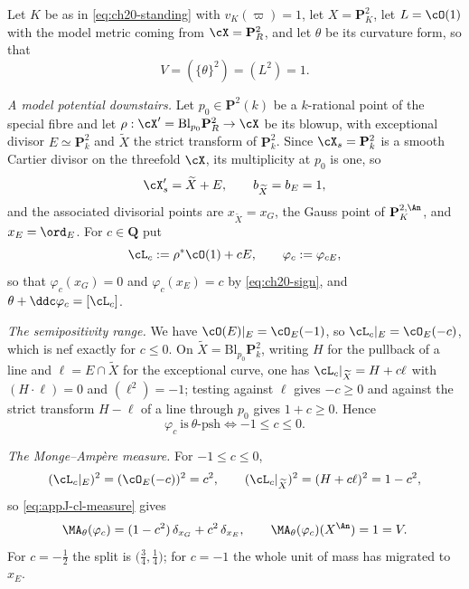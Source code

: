 \begin{example}
\label{ex:ch30-surface-blowup}
Let $K$ be as in \eqref{eq:ch20-standing} with $v_K(\varpi)=1$, let
$X=\mathbf P^2_K$, let $L=\cO(1)$ with the model metric coming from
$\cX=\mathbf P^2_R$, and let $\theta$ be its curvature form, so that
\[
                V=(\{\theta\}^2)=(L^2)=1 .
\]

\emph{A model potential downstairs.}  Let $p_0\in\mathbf P^2(k)$ be a
$k$-rational point of the special fibre and let
$\rho:\cX'=\mathrm{Bl}_{p_0}\mathbf P^2_R\to\cX$ be its blowup, with
exceptional divisor $E\simeq\mathbf P^2_k$ and $\widetilde X$ the strict
transform of $\mathbf P^2_k$.  Since $\cX_s=\mathbf P^2_k$ is a smooth
Cartier divisor on the threefold $\cX$, its multiplicity at $p_0$ is
one, so
\[
                \cX'_s=\widetilde X+E,
                \qquad b_{\widetilde X}=b_E=1,
\]
and the associated divisorial points are $x_{\widetilde X}=x_G$, the
Gauss point of $\mathbf P^{2,\An}_K$, and $x_E=\ord_E$.  For
$c\in\mathbf Q$ put
\[
 \cL_c:=\rho^*\cO(1)+cE,
 \qquad
 \varphi_c:=\varphi_{cE},
\]
so that $\varphi_c(x_G)=0$ and $\varphi_c(x_E)=c$ by
\eqref{eq:ch20-sign}, and $\theta+\ddc\varphi_c=[\cL_c]$.

\emph{The semipositivity range.}  We have $\cO(E)|_E=\cO_E(-1)$, so
$\cL_c|_E=\cO_E(-c)$, which is nef exactly for $c\leq0$.  On
$\widetilde X=\mathrm{Bl}_{p_0}\mathbf P^2_k$, writing $H$ for the
pullback of a line and $\ell=E\cap\widetilde X$ for the exceptional curve,
one has $\cL_c|_{\widetilde X}=H+c\ell$ with $(H\cdot\ell)=0$ and
$(\ell^2)=-1$; testing against $\ell$ gives $-c\geq0$ and against the
strict transform $H-\ell$ of a line through $p_0$ gives $1+c\geq0$.
Hence
\begin{equation}
\label{eq:ch30-surface-nef-range}
 \varphi_c\ \text{is}\ \theta\text{-psh}
 \iff -1\leq c\leq 0 .
\end{equation}

\emph{The Monge--Amp\`ere measure.}  For $-1\leq c\leq0$,
\[
 (\cL_c|_E)^2=(\cO_E(-c))^2=c^2,
 \qquad
 (\cL_c|_{\widetilde X})^2=(H+c\ell)^2=1-c^2 ,
\]
so \eqref{eq:appJ-cl-measure} gives
\begin{equation}
\label{eq:ch30-surface-ma-down}
 \MA_\theta(\varphi_c)=(1-c^2)\,\delta_{x_G}+c^2\,\delta_{x_E},
 \qquad
 \MA_\theta(\varphi_c)(X^{\An})=1=V .
\end{equation}
For $c=-\tfrac12$ the split is $\bigl(\tfrac34,\tfrac14\bigr)$; for
$c=-1$ the whole unit of mass has migrated to $x_E$.


\end{example}
